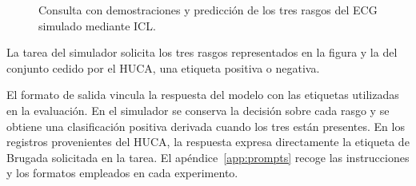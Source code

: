 \begin{figure}[H]
  \centering
  \caption{Consulta con demostraciones y predicción de los tres rasgos del ECG simulado mediante ICL.}
  \label{fig:icl_context_window}
\end{figure}

La tarea del simulador solicita los tres rasgos representados en la figura y la del conjunto cedido por el HUCA, una etiqueta positiva o negativa.

El formato de salida vincula la respuesta del modelo con las etiquetas utilizadas en la evaluación. En el simulador se conserva la decisión sobre cada rasgo y se obtiene una clasificación positiva derivada cuando los tres están presentes. En los registros provenientes del HUCA, la respuesta expresa directamente la etiqueta de Brugada solicitada en la tarea. El apéndice~\ref{app:prompts} recoge las instrucciones y los formatos empleados en cada experimento.
